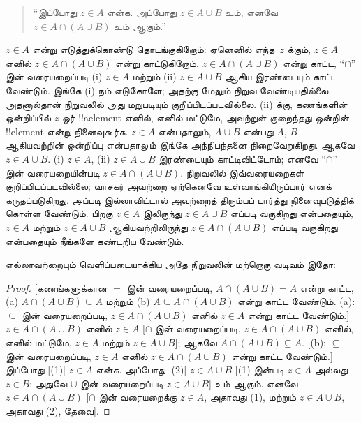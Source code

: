 \documentclass[../../../include/open-logic-section]{subfiles}
\begin{document}
\begin{quote}
``இப்போது $z \in A$ என்க. அப்போது $z \in A \cup B$
  உம், எனவே $z \in A \cap (A \cup B)$ உம் ஆகும்.''
\end{quote}

$z \in A$ என்று எடுத்துக்கொண்டு தொடங்குகிறோம்:
ஏனெனில் எந்த~$z$ க்கும், $z \in A$ எனில்
$z \in A \cap (A \cup B)$ என்று காட்டுகிறோம்.
$z \in A \cap (A \cup B)$ என்று காட்ட,
``$\cap$'' இன் வரையறைப்படி (i) $z \in A$
மற்றும் (ii) $z \in A \cup B$ ஆகிய இரண்டையும்
காட்ட வேண்டும். இங்கே (i) நம் எடுகோளே; அதற்கு
மேலும் நிறுவ வேண்டியதில்லை. அதனால்தான் நிறுவலில்
அது மறுபடியும் குறிப்பிடப்படவில்லை. (ii) க்கு,
கணங்களின் ஒன்றிப்பில் $z$ ஓர் !!a{element} எனில்,
எனில் மட்டுமே, அவற்றுள் குறைந்தது ஒன்றின்
!!{element} என்று நினைவுகூர்க. $z \in A$ என்பதாலும்,
$A \cup B$ என்பது $A$, $B$ ஆகியவற்றின்
ஒன்றிப்பு என்பதாலும் இங்கே அந்நிபந்தனை நிறைவேறுகிறது.
ஆகவே $z \in A \cup B$. (i) $z \in A$,
(ii) $z \in A \cup B$ இரண்டையும் காட்டிவிட்டோம்;
எனவே ``$\cap$'' இன் வரையறையின்படி
$z \in A \cap (A \cup B)$. நிறுவலில் இவ்வரையறைகள்
குறிப்பிடப்படவில்லை; வாசகர் அவற்றை ஏற்கெனவே
உள்வாங்கியிருப்பார் எனக் கருதப்படுகிறது. அப்படி
இல்லாவிட்டால் அவற்றைத் திரும்பப் பார்த்து நினைவுபடுத்திக்
கொள்ள வேண்டும். பிறகு $z \in A$ இலிருந்து
$z \in A \cup B$ எப்படி வருகிறது என்பதையும்,
$z \in A$ மற்றும் $z \in A \cup B$ ஆகியவற்றிலிருந்து
$z \in A \cap (A \cup B)$ எப்படி வருகிறது என்பதையும்
நீங்களே கண்டறிய வேண்டும்.

எல்லாவற்றையும் வெளிப்படையாக்கிய அதே நிறுவலின்
மற்றொரு வடிவம் இதோ:
\begin{proof}{}
[கணங்களுக்கான $=$ இன் வரையறைப்படி,
$A \cap (A \cup B) = A$ என்று காட்ட,
(a) $A \cap (A \cup B) \subseteq A$ மற்றும்
(b) $A \subseteq A \cap (A \cup B)$ என்று
காட்ட வேண்டும். (a): $\subseteq$ இன் வரையறைப்படி,
$z \in A \cap (A \cup B)$ எனில் $z \in A$
என்று காட்ட வேண்டும்.] $z \in A \cap (A \cup B)$
எனில் $z \in A$ [$\cap$ இன் வரையறைப்படி,
$z \in A \cap (A \cup B)$ எனில், எனில் மட்டுமே,
$z \in A$ மற்றும் $z \in A \cup B$]; ஆகவே
$A \cap (A \cup B) \subseteq A$.
[(b): $\subseteq$ இன் வரையறைப்படி,
$z \in A$ எனில் $z \in A \cap (A \cup B)$
என்று காட்ட வேண்டும்.] இப்போது [(1)] $z \in A$
என்க. அப்போது [(2)] $z \in A \cup B$
[(1) இன்படி $z \in A$ அல்லது $z \in B$;
அதுவே $\cup$ இன் வரையறைப்படி $z \in A \cup B$]
உம் ஆகும். எனவே $z \in A \cap (A \cup B)$
[$\cap$ இன் வரையறைக்கு $z \in A$, அதாவது
(1), மற்றும்
$z \in A \cup B$, அதாவது (2), தேவை].
\end{proof}
\end{document}
